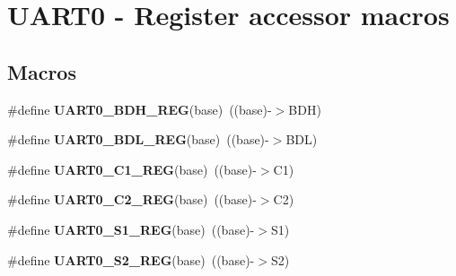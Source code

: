 \hypertarget{group___u_a_r_t0___register___accessor___macros}{}\section{U\+A\+R\+T0 -\/ Register accessor macros}
\label{group___u_a_r_t0___register___accessor___macros}
\subsection*{Macros}
\begin{DoxyCompactItemize}
\item 
\mbox{\label{group___u_a_r_t0___register___accessor___macros_ga92a738cb5fe10aaf02d85fb5c5b6a936}} 
\#define {\bfseries U\+A\+R\+T0\+\_\+\+B\+D\+H\+\_\+\+R\+EG}(base)~((base)-\/$>$B\+DH)
\item 
\mbox{\label{group___u_a_r_t0___register___accessor___macros_gab76185bb7da61762628de2ad9b344da0}} 
\#define {\bfseries U\+A\+R\+T0\+\_\+\+B\+D\+L\+\_\+\+R\+EG}(base)~((base)-\/$>$B\+DL)
\item 
\mbox{\label{group___u_a_r_t0___register___accessor___macros_gae73e3f20d2d62db8a394ae91114f482d}} 
\#define {\bfseries U\+A\+R\+T0\+\_\+\+C1\+\_\+\+R\+EG}(base)~((base)-\/$>$C1)
\item 
\mbox{\label{group___u_a_r_t0___register___accessor___macros_ga040e10b824110fe8f17ea29b980de16c}} 
\#define {\bfseries U\+A\+R\+T0\+\_\+\+C2\+\_\+\+R\+EG}(base)~((base)-\/$>$C2)
\item 
\mbox{\label{group___u_a_r_t0___register___accessor___macros_gacc27239085f84d5e5e4522405f885258}} 
\#define {\bfseries U\+A\+R\+T0\+\_\+\+S1\+\_\+\+R\+EG}(base)~((base)-\/$>$S1)
\item 
\mbox{\label{group___u_a_r_t0___register___accessor___macros_ga60ac479ecfdaf9c926820c8d9fa304a3}} 
\#define {\bfseries U\+A\+R\+T0\+\_\+\+S2\+\_\+\+R\+EG}(base)~((base)-\/$>$S2)

\end{DoxyCompactItemize}
